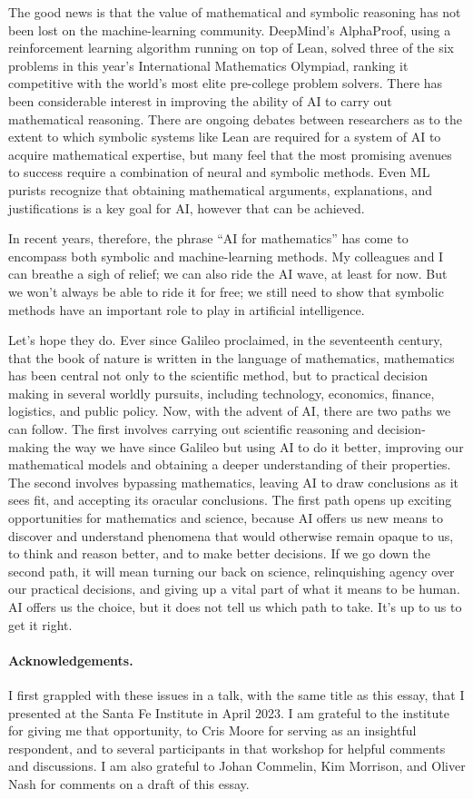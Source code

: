 \documentclass[11pt]{article}
\begin{document}
The good news is that the value of mathematical and symbolic reasoning has not been lost on the machine-learning community. DeepMind's AlphaProof, using a reinforcement learning algorithm running on top of Lean, solved three of the six problems in this year's International Mathematics Olympiad, ranking it competitive with the world's most elite pre-college problem solvers. There has been considerable interest in improving the ability of AI to carry out mathematical reasoning. There are ongoing debates between researchers as to the extent to which symbolic systems like Lean are required for a system of AI to acquire mathematical expertise, but many feel that the most promising avenues to success require a combination of neural and symbolic methods. Even ML purists recognize that obtaining mathematical arguments, explanations, and justifications is a key goal for AI, however that can be achieved.

In recent years, therefore, the phrase ``AI for mathematics'' has come to encompass both symbolic and machine-learning methods. My colleagues and I can breathe a sigh of relief; we can also ride the AI wave, at least for now. But we won't always be able to ride it for free; we still need to show that symbolic methods have an important role to play in artificial intelligence.

Let's hope they do. Ever since Galileo proclaimed, in the seventeenth century, that the book of nature is written in the language of mathematics, mathematics has been central not only to the scientific method, but to practical decision making in several worldly pursuits, including technology, economics, finance, logistics, and public policy. Now, with the advent of AI, there are two paths we can follow. The first involves carrying out scientific reasoning and decision-making the way we have since Galileo but using AI to do it better, improving our mathematical models and obtaining a deeper understanding of their properties. The second involves bypassing mathematics, leaving AI to draw conclusions as it sees fit, and accepting its oracular conclusions. The first path opens up exciting opportunities for mathematics and science, because AI offers us new means to discover and understand phenomena that would otherwise remain opaque to us, to think and reason better, and to make better decisions. If we go down the second path, it will mean turning our back on science, relinquishing agency over our practical decisions, and giving up a vital part of what it means to be human. AI offers us the choice, but it does not tell us which path to take. It's up to us to get it right.

\paragraph{Acknowledgements.} I first grappled with these issues in a talk, with the same title as this essay, that I presented at the Santa Fe Institute in April 2023. I am grateful to the institute for giving me that opportunity, to Cris Moore for serving as an insightful respondent, and to several participants in that workshop for helpful comments and discussions. I am also grateful to Johan Commelin, Kim Morrison, and Oliver Nash for comments on a draft of this essay.
\end{document}
